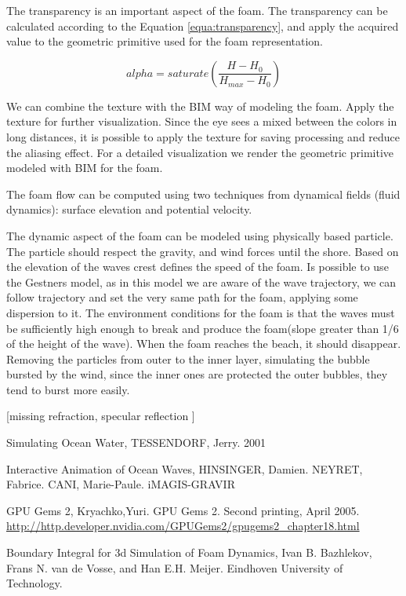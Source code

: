 \documentclass{report}
\begin{document}
The transparency is an important aspect of the foam. The transparency can be calculated\cite{nvidia} according to the Equation \ref{equa:transparency}, and apply the acquired value to the geometric primitive used for the foam representation.

\begin{equation}
alpha=saturate(\frac{H-H_0}{H_{max} - H_0})
\label{equa:transparency}
\end{equation}

We can combine the texture with the BIM way of modeling the foam. Apply the texture for further visualization. Since the eye sees a mixed between the colors in long distances, it is possible to apply the texture for saving processing and reduce the aliasing effect.
For a detailed visualization we render the geometric primitive modeled with BIM for the foam.

The foam flow can be computed using two techniques from dynamical fields (fluid dynamics): surface elevation and potential velocity.

The dynamic aspect of the foam can be modeled using physically based particle. The particle should respect the gravity, and wind forces until the shore. Based on the elevation of the waves crest defines the speed of the foam. Is possible to use the Gestners model, as in this model we are aware of the wave trajectory, we can follow trajectory and set the very same path for the foam, applying some dispersion to it\cite{iaow}.
The environment conditions for the foam is that the waves must be sufficiently high enough to break and produce the foam(slope greater than 1/6 \cite{sow} of the height of the wave).
When the foam reaches the beach, it should disappear. Removing the particles from outer to the inner layer, simulating the bubble bursted by the wind, since the inner ones are protected the outer bubbles, they tend to burst more easily.

[missing refraction, specular reflection ]


\begin{thebibliography}{9}

  Simulating Ocean Water,
  TESSENDORF, Jerry.
  2001

  Interactive Animation of Ocean Waves,
  HINSINGER, Damien. NEYRET, Fabrice. CANI, Marie-Paule.
  iMAGIS-GRAVIR

  GPU Gems 2,
  Kryachko,Yuri.
  GPU Gems 2. 
  Second printing, April 2005.
  \url{http://http.developer.nvidia.com/GPUGems2/gpugems2_chapter18.html}

  Boundary Integral for 3d Simulation of Foam Dynamics,
  Ivan B. Bazhlekov, Frans N. van de Vosse, and Han E.H. Meijer.
  Eindhoven University of Technology.

\end{thebibliography}
\end{document}
